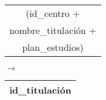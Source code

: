   \begin{center}
    \begin{minipage}{4.2cm}{\begin{tabular}{ | c | }
                  \hline
                  (id\_centro + \\
                  nombre\_titulación + \\
                  plan\_estudios) \\
                  \hline
                 \end{tabular} }
    \end{minipage}
    \begin{minipage}{0.7cm}{$\longrightarrow$}
    \end{minipage}
    \begin{minipage}{5.9cm}{\begin{tabular}{ | c | }
                  \hline
                  id\_titulación \\
                  \hline
                 \end{tabular} }
    \end{minipage}
  \end{center}
